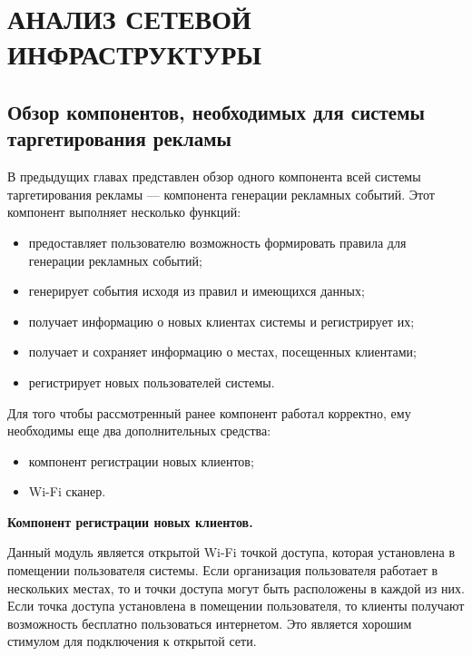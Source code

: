 \chapter{АНАЛИЗ СЕТЕВОЙ ИНФРАСТРУКТУРЫ}

\section{Обзор компонентов, необходимых для системы таргетирования рекламы}

В предыдущих главах представлен обзор одного компонента всей системы таргетирования рекламы --- компонента генерации рекламных событий. Этот компонент выполняет несколько функций:

\begin{itemize}
	\item предоставляет пользователю возможность формировать правила для генерации рекламных событий;
	\item генерирует события исходя из правил и имеющихся данных;
	\item получает информацию о новых клиентах системы и регистрирует их;
	\item получает и сохраняет информацию о местах, посещенных клиентами;
	\item регистрирует новых пользователей системы.
\end{itemize}

Для того чтобы рассмотренный ранее компонент работал корректно, ему необходимы еще два дополнительных средства:

\begin{itemize}
	\item компонент регистрации новых клиентов;
	\item Wi-Fi сканер.
\end{itemize}

\textbf{Компонент регистрации новых клиентов.}

Данный модуль является открытой Wi-Fi точкой доступа, которая установлена в помещении пользователя системы. Если организация пользователя работает в нескольких местах, то и точки доступа могут быть расположены в каждой из них. Если точка доступа установлена в помещении пользователя, то клиенты получают возможность бесплатно пользоваться интернетом. Это является хорошим стимулом для подключения к открытой сети. 

